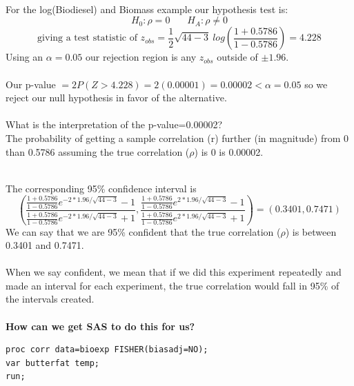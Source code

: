~\\~\\~\\
For the log(Biodiesel) and Biomass example our hypothesis test is:\\
$$H_0:\rho=0 ~~~~~~~~H_A: \rho\neq 0$$
$$\text{giving a test statistic of } z_{obs}=\frac{1}{2}\sqrt{44-3}~log\left(\frac{1+0.5786}{1-0.5786}\right)=4.228$$
Using an $\alpha=0.05$ our rejection region is any $z_{obs}$ outside of $\pm 1.96$.\\~\\
Our p-value $=2P(Z>4.228) = 2(0.00001) = 0.00002 < \alpha = 0.05$ so we reject our null hypothesis in favor of the alternative.\\~\\
What is the interpretation of the p-value=0.00002?\\
\indent The probability of getting a sample correlation (r) further (in magnitude) from 0 than 0.5786 assuming the true correlation ($\rho$) is 0 is 0.00002.\\~\\

\newpage

The corresponding 95\% confidence interval is 
$$\left(\frac{\frac{1+0.5786}{1-0.5786}e^{-2*1.96/\sqrt{44-3}}-1}{\frac{1+0.5786}{1-0.5786}e^{-2*1.96/\sqrt{44-3}}+1}, \frac{\frac{1+0.5786}{1-0.5786}e^{2*1.96/\sqrt{44-3}}-1}{\frac{1+0.5786}{1-0.5786}e^{2*1.96/\sqrt{44-3}}+1}\right) = (0.3401, 0.7471)$$
We can say that we are 95\% confident that the true correlation ($\rho$) is between 0.3401 and 0.7471.\\~\\
When we say confident, we mean that if we did this experiment repeatedly and made an interval for each experiment, the true correlation would fall in 95\% of the intervals created.\\~\\

\textbf{How can we get SAS to do this for us?}
\begin{small}
\begin{verbatim}
proc corr data=bioexp FISHER(biasadj=NO);
var butterfat temp;
run; 
\end{verbatim}
\end{small}

